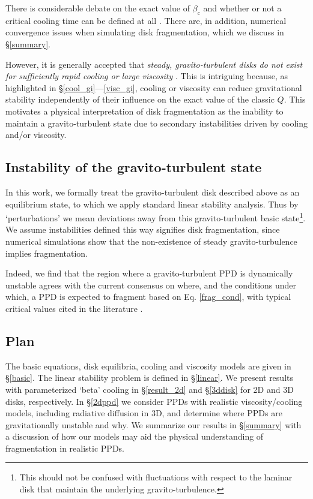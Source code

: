 \documentclass[iop, numberedappendix]{emulateapj}
\begin{document}
There is considerable debate on the exact value of $\beta_\mathrm{c}$  
and whether or not a critical cooling time can be defined at all
\citep{meru11,lodato11,meru12,paardekooper12,hopkins13}. There are, in
addition, numerical convergence issues when simulating disk  
fragmentation, which we discuss in \S\ref{summary}. 

However, it is generally accepted that \emph{steady, gravito-turbulent
  disks do not  
  exist for sufficiently rapid cooling or large viscosity} \citep{johnson03}.   
This is intriguing because, as highlighted in
\S\ref{cool_gi}---\ref{visc_gi}, cooling or viscosity can reduce 
gravitational stability independently of their influence on the exact
value of the classic $Q$. This 
motivates a physical      
interpretation of disk fragmentation as the inability to maintain a
gravito-turbulent state due to 
secondary instabilities driven by cooling and/or viscosity.

{\bf 
\subsection{Instability of the gravito-turbulent state}\label{gi_of_gi}
  In this work, we formally treat the gravito-turbulent
  disk described above as an equilibrium state, to which we apply    
  standard linear stability analysis. Thus by `perturbations' we mean   
  deviations away from this gravito-turbulent 
  basic state\footnote{This should not be confused with 
    fluctuations with respect to the 
    laminar disk that maintain the underlying
    gravito-turbulence.}. 
  We assume instabilities defined this way  
  signifies disk fragmentation, since numerical simulations  
  show that the non-existence of steady gravito-turbulence implies 
  fragmentation.   
}

Indeed, we find that the region where a gravito-turbulent PPD is
dynamically unstable agrees with the current consensus on  where, and
the conditions under which, a PPD is expected to fragment based on
Eq. \ref{frag_cond}, with typical critical values cited in the
literature \citep[e.g. $\beta_c\sim
  3,\,\alpha_c\sim0.1$,][]{gammie01,rice05}.    
   
\subsection{Plan}\label{plan}

The basic equations, disk equilibria, cooling and viscosity models are 
given in \S\ref{basic}. The linear stability problem is defined in 
\S\ref{linear}. We present results with parameterized `beta' cooling in 
\S\ref{result_2d} and \S\ref{3ddisk} for 2D and 3D disks,
respectively. %
In \S\ref{2dppd} we consider PPDs with realistic viscosity/cooling   
models, including radiative diffusion in 3D, and determine where PPDs
are gravitationally unstable and why. We summarize our results in
\S\ref{summary} with a discussion of how our models may aid the 
physical understanding of fragmentation in realistic PPDs.   
\end{document}
